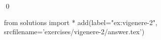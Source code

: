 
\begin{ex} 
  \label{ex:vigenere-2}
  
  \qed
\end{ex} 
\begin{python0}
from solutions import *
add(label="ex:vigenere-2",
    srcfilename='exercises/vigenere-2/answer.tex') 
\end{python0}
